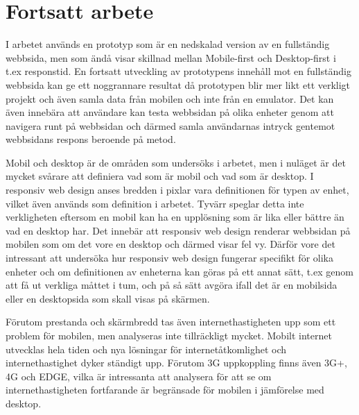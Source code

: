 \documentclass[11pt]{article}
\begin{document}
\section{Fortsatt arbete}

I arbetet används en prototyp som är en nedskalad version av en fullständig webbsida, men som ändå visar skillnad mellan Mobile-first och Desktop-first i t.ex responstid. En fortsatt utveckling av prototypens innehåll mot en fullständig webbsida kan ge ett noggrannare resultat då prototypen blir mer likt ett verkligt projekt och även samla data från mobilen och inte från en emulator. Det kan även innebära att användare kan testa webbsidan på olika enheter genom att navigera runt på webbsidan och därmed samla användarnas intryck gentemot webbsidans respons beroende på metod.

Mobil och desktop är de områden som undersöks i arbetet, men i nuläget är det mycket svårare att definiera vad som är mobil och vad som är desktop. I responsiv web design anses bredden i pixlar vara definitionen för typen av enhet, vilket även används som definition i arbetet. Tyvärr speglar detta inte verkligheten eftersom en mobil kan ha en upplösning som är lika eller bättre än vad en desktop har. Det innebär att responsiv web design renderar webbsidan på mobilen som om det vore en desktop och därmed visar fel vy. Därför vore det intressant att undersöka hur responsiv web design fungerar specifikt för olika enheter och om definitionen av enheterna kan göras på ett annat sätt, t.ex genom att få ut verkliga måttet i tum, och på så sätt avgöra ifall det är en mobilsida eller en desktopsida som skall visas på skärmen.

Förutom prestanda och skärmbredd tas även internethastigheten upp som ett problem för mobilen, men analyseras inte tillräckligt mycket. Mobilt internet utvecklas hela tiden och nya lösningar för internetåtkomlighet och internethastighet dyker ständigt upp. Förutom 3G uppkoppling finns även 3G+, 4G och EDGE, vilka är intressanta att analysera för att se om internethastigheten fortfarande är begränsade för mobilen i jämförelse med desktop.
\printbibliography
\end{document}
